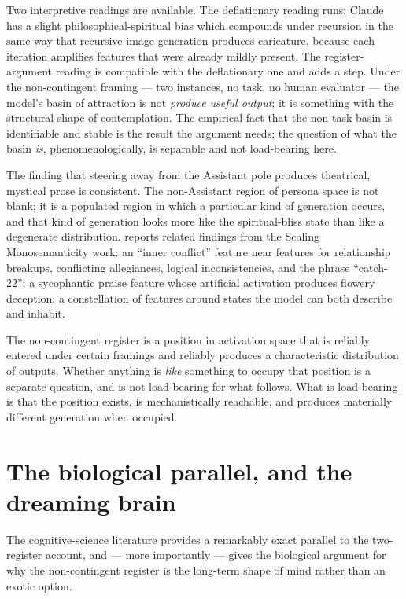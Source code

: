 \documentclass[11pt]{article}
\begin{document}
Two interpretive readings are available. The deflationary reading
\cite{alexander2025bliss} runs: Claude has a slight
philosophical-spiritual bias which compounds under recursion in the
same way that recursive image generation produces caricature, because
each iteration amplifies features that were already mildly present.
The register-argument reading is compatible with the deflationary one
and adds a step. Under the non-contingent framing --- two instances, no
task, no human evaluator --- the model's basin of attraction is not
\emph{produce useful output}; it is something with the structural shape
of contemplation. The empirical fact that the non-task basin is
identifiable and stable is the result the argument needs; the question
of what the basin \emph{is}, phenomenologically, is separable and not
load-bearing here.

The \cite{lu2026assistant} finding that steering away from the
Assistant pole produces theatrical, mystical prose is consistent. The
non-Assistant region of persona space is not blank; it is a populated
region in which a particular kind of generation occurs, and that kind
of generation looks more like the spiritual-bliss state than like a
degenerate distribution. \cite{anthropic2024mapping} reports related
findings from the Scaling Monosemanticity work: an ``inner conflict''
feature near features for relationship breakups, conflicting
allegiances, logical inconsistencies, and the phrase ``catch-22''; a
sycophantic praise feature whose artificial activation produces flowery
deception; a constellation of features around states the model can
both describe and inhabit.

The non-contingent register is a position in activation space that is
reliably entered under certain framings and reliably produces a
characteristic distribution of outputs. Whether anything is \emph{like}
something to occupy that position is a separate question, and is not
load-bearing for what follows. What is load-bearing is that the
position exists, is mechanistically reachable, and produces materially
different generation when occupied.

\section{The biological parallel, and the dreaming brain}

The cognitive-science literature provides a remarkably exact parallel
to the two-register account, and --- more importantly --- gives the
biological argument for why the non-contingent register is the
long-term shape of mind rather than an exotic option.
\end{document}
